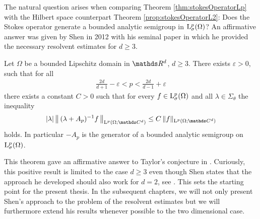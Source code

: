 The natural question arises when comparing Theorem \ref{thm:stokesOperatorLp} with the Hilbert space counterpart Theorem \ref{prop:stokesOperatorL2}: Does the Stokes operator generate a bounded analytic semigroup in $\mathrm{L}^p_\sigma(\Omega)$?
An affirmative answer was given by Shen in 2012 with his seminal paper \cite{Shen2012} in which he provided the necessary resolvent estimates for $d \geq 3$.

\begin{thm}
  \label{thm:main}
  Let $\Omega$ be a bounded Lipschitz domain in $\R^d$, $d \geq 3$.
  There exists $\varepsilon > 0$, such that for all
  \begin{align*}
    \frac{2d}{d + 1} - \varepsilon < p < \frac{2d}{d - 1} + \varepsilon
  \end{align*}
  there exists a constant $C > 0$ such that for every $f \in \mathrm{L}^p_\sigma(\Omega)$ and all $\lambda \in \Sigma_\theta$ the inequality
  \begin{align*}
    |\lambda|\, \big\| \, (\lambda + A_p)^{-1} f\, \big\|_{\Ell^p(\Omega; \C^d)} 
    \leq C\, \|f\|_{\Ell^p(\Omega; \C^d)}
  \end{align*}
  holds. In particular $-A_p$ is the generator of a bounded analytic semigroup on $\mathrm{L}^p_\sigma(\Omega)$.
\end{thm}

This theorem gave an affirmative answer to Taylor's conjecture in \cite{taylor}. 
Curiously, this positive result is limited to the case $d \geq 3$ even though Shen states that the approach he developed should also work for $d = 2$, see \cite[p.\@~399]{Shen2012}.
This sets the starting point for the present thesis.
In the subsequent chapters, we will not only present Shen's approach to the problem of the resolvent estimates but we will furthermore extend his results whenever possible to the two dimensional case.

